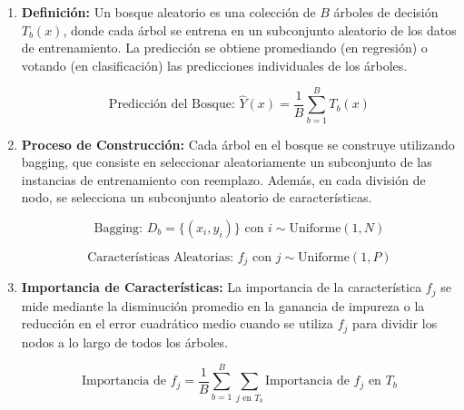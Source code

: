 \documentclass{article}
\begin{document}
\begin{enumerate}
    \item \textbf{Definición:}
        Un bosque aleatorio es una colección de \(B\) árboles de decisión \(T_b(x)\), donde cada árbol se entrena en un subconjunto aleatorio de los datos de entrenamiento. La predicción se obtiene promediando (en regresión) o votando (en clasificación) las predicciones individuales de los árboles.

        \[ \textrm{Predicción del Bosque: } \hat{Y}(x) = \frac{1}{B} \sum_{b=1}^{B} T_b(x) \]

    \item \textbf{Proceso de Construcción:}
        Cada árbol en el bosque se construye utilizando bagging, que consiste en seleccionar aleatoriamente un subconjunto de las instancias de entrenamiento con reemplazo. Además, en cada división de nodo, se selecciona un subconjunto aleatorio de características.

        \[ \textrm{Bagging: } D_b = \{(x_i, y_i)\} \textrm{ con } i \sim \textrm{Uniforme}(1, N) \]

        \[ \textrm{Características Aleatorias: } f_j \textrm{ con } j \sim \textrm{Uniforme}(1, P) \]

    \item \textbf{Importancia de Características:}
        La importancia de la característica \(f_j\) se mide mediante la disminución promedio en la ganancia de impureza o la reducción en el error cuadrático medio cuando se utiliza \(f_j\) para dividir los nodos a lo largo de todos los árboles.

        \[ \textrm{Importancia de } f_j = \frac{1}{B} \sum_{b=1}^{B} \sum_{j \textrm{ en } T_b} \textrm{Importancia de } f_j \textrm{ en } T_b \]

\end{enumerate}
\end{document}
